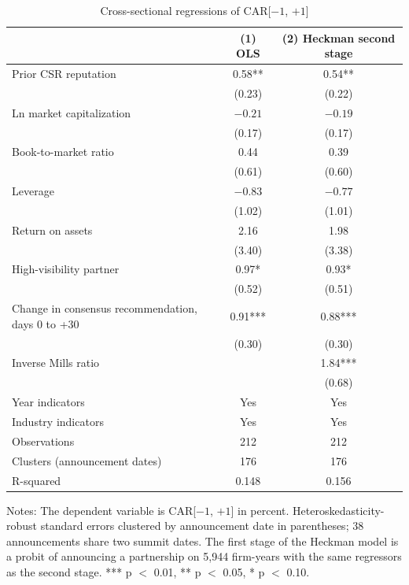 \documentclass[11pt]{article}
\begin{document}
\begin{table}[h!]
\centering
\begin{threeparttable}
\caption{Cross-sectional regressions of CAR[$-1$, $+1$]}
\small
\begin{tabular}{lcc}
\toprule
 & (1) OLS & (2) Heckman second stage \\
\midrule
Prior CSR reputation & 0.58** & 0.54** \\
 & (0.23) & (0.22) \\
Ln market capitalization & $-0.21$ & $-0.19$ \\
 & (0.17) & (0.17) \\
Book-to-market ratio & 0.44 & 0.39 \\
 & (0.61) & (0.60) \\
Leverage & $-0.83$ & $-0.77$ \\
 & (1.02) & (1.01) \\
Return on assets & 2.16 & 1.98 \\
 & (3.40) & (3.38) \\
High-visibility partner & 0.97* & 0.93* \\
 & (0.52) & (0.51) \\
Change in consensus recommendation, days 0 to +30 & 0.91*** & 0.88*** \\
 & (0.30) & (0.30) \\
Inverse Mills ratio & & 1.84*** \\
 & & (0.68) \\
\addlinespace
Year indicators & Yes & Yes \\
Industry indicators & Yes & Yes \\
Observations & 212 & 212 \\
Clusters (announcement dates) & 176 & 176 \\
R-squared & 0.148 & 0.156 \\
\bottomrule
\end{tabular}
\begin{tablenotes}\footnotesize
\item Notes: The dependent variable is CAR[$-1$, $+1$] in percent. Heteroskedasticity-robust standard errors clustered by announcement date in parentheses; 38 announcements share two summit dates. The first stage of the Heckman model is a probit of announcing a partnership on 5,944 firm-years with the same regressors as the second stage. *** p $<$ 0.01, ** p $<$ 0.05, * p $<$ 0.10.
\end{tablenotes}
\end{threeparttable}
\end{table}
\end{document}
